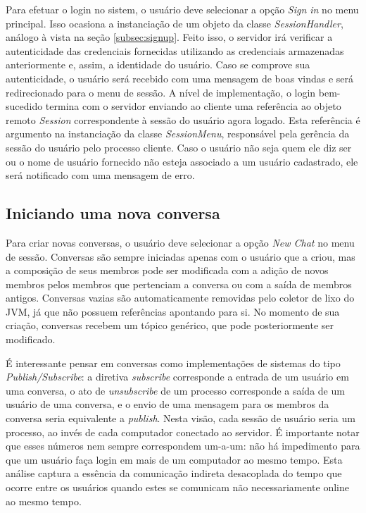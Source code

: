 \documentclass[../main.tex]{subfiles}
\begin{document}
Para efetuar o login no sistem, o usuário deve selecionar a opção \textit{Sign in} no menu principal.
Isso ocasiona a instanciação de um objeto da classe \textit{SessionHandler}, análogo à vista na seção \ref{subsec:signup}.
Feito isso, o servidor irá verificar a autenticidade das credenciais fornecidas utilizando as credenciais armazenadas anteriormente e, assim, a identidade do usuário.
Caso se comprove sua autenticidade, o usuário será recebido com uma mensagem de boas vindas e será redirecionado para o menu de sessão.
A nível de implementação, o login bem-sucedido termina com o servidor enviando ao cliente uma referência ao objeto remoto \textit{Session} correspondente à sessão do usuário agora logado.
Esta referência é argumento na instanciação da classe \textit{SessionMenu}, responsável pela gerência da sessão do usuário pelo processo cliente.
Caso o usuário não seja quem ele diz ser ou o nome de usuário fornecido não esteja associado a um usuário cadastrado, ele será notificado com uma mensagem de erro.

\subsection{Iniciando uma nova conversa}

Para criar novas conversas, o usuário deve selecionar a opção \textit{New Chat} no menu de sessão.
Conversas são sempre iniciadas apenas com o usuário que a criou, mas a composição de seus membros pode ser modificada com a adição de novos membros pelos membros que pertenciam a conversa ou com a saída de membros antigos.
Conversas vazias são automaticamente removidas pelo coletor de lixo do JVM, já que não possuem referências apontando para si.
No momento de sua criação, conversas recebem um tópico genérico, que pode posteriormente ser modificado.

É interessante pensar em conversas como implementações de sistemas do tipo \textit{Publish/Subscribe}: a diretiva \textit{subscribe} corresponde a entrada de um usuário em uma conversa, o ato de \textit{unsubscribe} de um processo corresponde a saída de um usuário de uma conversa, e o envio de uma mensagem para os membros da conversa seria equivalente a \textit{publish}.
Nesta visão, cada sessão de usuário seria um processo, ao invés de cada computador conectado ao servidor.
É importante notar que esses números nem sempre correspondem um-a-um: não há impedimento para que um usuário faça login em mais de um computador ao mesmo tempo.
Esta análise captura a essência da comunicação indireta desacoplada do tempo que ocorre entre os usuários quando estes se comunicam não necessariamente online ao mesmo tempo.
\end{document}
